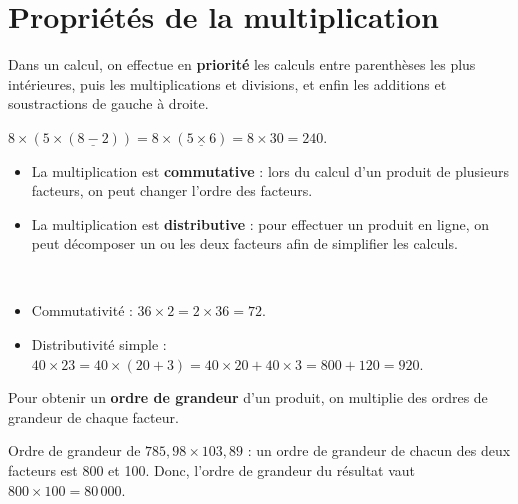 \section{Propriétés de la multiplication}

\begin{propriete}
   Dans un calcul, on effectue en {\bf priorité} les calculs entre parenthèses les plus intérieures, puis les multiplications et divisions, et enfin les additions et soustractions de gauche à droite.
\end{propriete}

\begin{exemple*1}
   $8\times(5\times(\underline{8-2})) =8\times(\underline{5\times6}) =8\times30 =240$.
\end{exemple*1}

\medskip

\begin{propriete}
   \begin{itemize}
      \item La multiplication est {\bf commutative} : lors du calcul d’un produit de plusieurs facteurs, on peut changer l’ordre des facteurs.
      \item La multiplication est {\bf distributive} : pour effectuer un produit en ligne, on peut décomposer un ou les deux facteurs afin de simplifier les calculs. 
   \end{itemize}
   \ \\ [-14mm]
\end{propriete}

\begin{exemple*1}
   \begin{itemize}
      \item Commutativité : $36\times2 =2\times36 =72$.
      \item Distributivité simple : $40\times23 =40\times(20+3)=40\times20+40\times3 =800+120 =920$.
   \end{itemize}
\end{exemple*1}

\begin{propriete}
   Pour obtenir un \textbf{ordre de grandeur} d'un produit, on multiplie des ordres de grandeur de chaque facteur.
\end{propriete}

\begin{exemple*1}
   Ordre de grandeur de $785, 98\times 103,89$ : un ordre de grandeur de chacun des deux facteurs est 800 et 100. Donc, l'ordre de grandeur du résultat vaut $800\times100 =80\,000$.
\end{exemple*1}